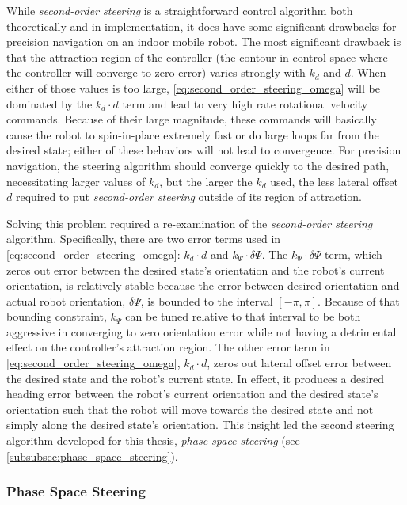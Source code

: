 While \emph{second-order steering} is a straightforward control algorithm both theoretically and in implementation, it does have some significant drawbacks for precision navigation on an indoor mobile robot. The most significant drawback is that the attraction region of the controller (the contour in control space where the controller will converge to zero error) varies strongly with $k_d$ and $d$. When either of those values is too large, \eqref{eq:second_order_steering_omega} will be dominated by the $k_d \cdot d$ term and lead to very high rate rotational velocity commands. Because of their large magnitude, these commands will basically cause the robot to spin-in-place extremely fast or do large loops far from the desired state; either of these behaviors will not lead to convergence. For precision navigation, the steering algorithm should converge quickly to the desired path, necessitating larger values of $k_d$, but the larger the $k_d$ used, the less lateral offset $d$ required to put \emph{second-order steering} outside of its region of attraction.

Solving this problem required a re-examination of the \emph{second-order steering} algorithm. Specifically, there are two error terms used in \eqref{eq:second_order_steering_omega}: $k_d \cdot d$ and $k_{\Psi} \cdot \delta\Psi$. The $k_{\Psi} \cdot \delta\Psi$ term, which zeros out error between the desired state's orientation and the robot's current orientation, is relatively stable because the error between desired orientation and actual robot orientation, $\delta\Psi$, is bounded to the interval $\left[-\pi,\pi\right]$. Because of that bounding constraint, $k_{\Psi}$ can be tuned relative to that interval to be both aggressive in converging to zero orientation error while not having a detrimental effect on the controller's attraction region. The other error term in \eqref{eq:second_order_steering_omega}, $k_d \cdot d$, zeros out lateral offset error between the desired state and the robot's current state. In effect, it produces a desired heading error between the robot's current orientation and the desired state's orientation such that the robot will move towards the desired state and not simply along the desired state's orientation. This insight led the second steering algorithm developed for this thesis, \emph{phase space steering} (see \autoref{subsubsec:phase_space_steering}).

\subsubsection{Phase Space Steering}\label{subsubsec:phase_space_steering}

